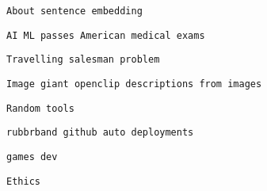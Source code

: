       
       
        \protect\hypertarget{ID_966185454}{}{}

\begin{verbatim}
About sentence embedding
\end{verbatim}
       

       
       
        \protect\hypertarget{ID_977289991}{}{}

\begin{verbatim}
AI ML passes American medical exams
\end{verbatim}
       

       
       
        \protect\hypertarget{ID_608043101}{}{}

\begin{verbatim}
Travelling salesman problem
\end{verbatim}
       

       
       
        \protect\hypertarget{ID_1041512}{}{}

\begin{verbatim}
Image giant openclip descriptions from images
\end{verbatim}
       
     

     
     
      \protect\hypertarget{ID_1214422178}{}{}

\begin{verbatim}
Random tools
\end{verbatim}

       
       
        \protect\hypertarget{ID_941008535}{}{}

\begin{verbatim}
rubbrband github auto deployments
\end{verbatim}
       

       
       
        \protect\hypertarget{ID_1658429867}{}{}

\begin{verbatim}
games dev
\end{verbatim}
       
     

     
     
      \protect\hypertarget{ID_921158521}{}{}

\begin{verbatim}
Ethics
\end{verbatim}

